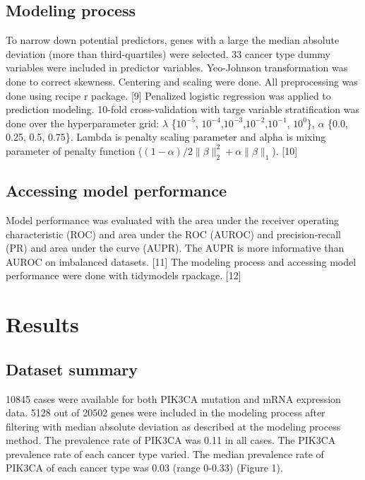 \documentclass[10pt,letterpaper]{article}
\begin{document}
\hypertarget{modeling-process}{%
\subsection{Modeling process}\label{modeling-process}}

To narrow down potential predictors, genes with a large the median
absolute deviation (more than third-quartiles) were selected. 33 cancer
type dummy variables were included in predictor variables. Yeo-Johnson
transformation was done to correct skewness. Centering and scaling were
done. All preprocessing was done using recipe r package. {[}9{]}
Penalized logistic regression was applied to prediction modeling.
10-fold cross-validation with targe variable stratification was done
over the hyperparameter grid: \(\lambda\) \{\(10^{-5}\),
\(10^{-4}\),\(10^{-3}\),\(10^{-2}\),\(10^{-1}\), \(10^{0}\)\},
\(\alpha\) \{0.0, 0.25, 0.5, 0.75\}. Lambda is penalty scaling parameter
and alpha is mixing parameter of penalty function
(\((1-\alpha)/2 \lVert\beta\rVert_2^2+\alpha\lVert \beta \rVert_1\)).
{[}10{]}

\hypertarget{accessing-model-performance}{%
\subsection{Accessing model
performance}\label{accessing-model-performance}}

Model performance was evaluated with the area under the receiver
operating characteristic (ROC) and area under the ROC (AUROC) and
precision-recall (PR) and area under the curve (AUPR). The AUPR is more
informative than AUROC on imbalanced datasets. {[}11{]} The modeling
process and accessing model performance were done with tidymodels
rpackage. {[}12{]}

\hypertarget{results}{%
\section{Results}\label{results}}

\hypertarget{dataset-summary}{%
\subsection{Dataset summary}\label{dataset-summary}}

10845 cases were available for both PIK3CA mutation and mRNA expression
data. 5128 out of 20502 genes were included in the modeling process
after filtering with median absolute deviation as described at the
modeling process method. The prevalence rate of PIK3CA was 0.11 in all
cases. The PIK3CA prevalence rate of each cancer type varied. The median
prevalence rate of PIK3CA of each cancer type was 0.03 (range 0-0.33)
(Figure 1).
\end{document}
